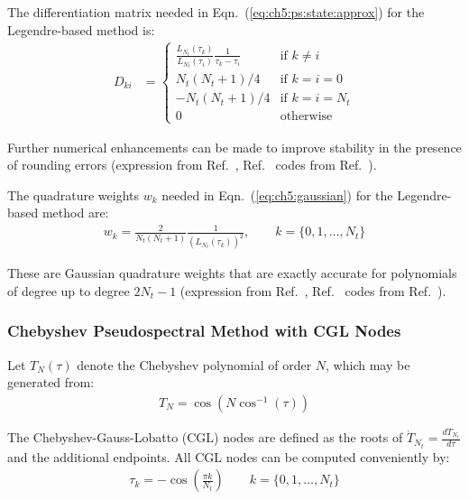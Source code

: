 The differentiation matrix needed in Eqn.~(\ref{eq:ch5:ps:state:approx}) for the Legendre-based method is:
\begin{align}
D_{ki} &= \begin{cases}
\frac{L_{N_t}(\tau_k)}{L_{N_t}(\tau_i)} \frac{1}{\tau_k - \tau_i} & \text{if } k \neq i \\
{N_t}({N_t}+1)/4 & \text{if } k = i = 0 \\
-{N_t}({N_t}+1)/4 & \text{if } k = i = {N_t} \\
0 & \text{otherwise}
\end{cases}
\end{align}

\noindent Further numerical enhancements can be made to improve stability in the presence of rounding errors (expression from Ref.~\cite{Becerra2010b}, Ref.~\cite{github-basic-multiple-interval-pseudospectral} codes from Ref.~\cite{Shen2011a}).

The quadrature weights ${w}_k$ needed in Eqn.~(\ref{eq:ch5:gaussian}) for the Legendre-based method are:
\begin{align}
{w}_k = \frac{2}{N_t(N_t+1)} \frac{1}{\left(L_{N_t}(\tau_k)\right)^2}, \qquad k = \{0,1,\dots,N_t\}
\end{align}

\noindent These are Gaussian quadrature weights that are exactly accurate for polynomials of degree up to degree $2N_t - 1$ (expression from Ref.~\cite{Fahroo2008a}, Ref.~\cite{github-basic-multiple-interval-pseudospectral} codes from Ref.~\cite{Shen2011a}).

\subsubsection{Chebyshev Pseudospectral Method with CGL Nodes \label{sec:app3:sCGL}}

Let $T_N(\tau)$ denote the Chebyshev polynomial of order $N$, which may be generated from:
\begin{align}
T_{N} = \cos\left( N \cos^{-1}\left(\tau\right)\right)
\end{align}

\noindent The Chebyshev-Gauss-Lobatto (CGL) nodes are defined as the roots of $\dot{T}_{N_t} = \frac{d{T}_{N_t}}{d\tau}$ and the additional endpoints. All CGL nodes can be computed conveniently by:
\begin{align}
\tau_k = -\cos\left(\frac{\pi k}{N_t} \right) \qquad k = \{0,1,\dots,N_t \}
\end{align}

